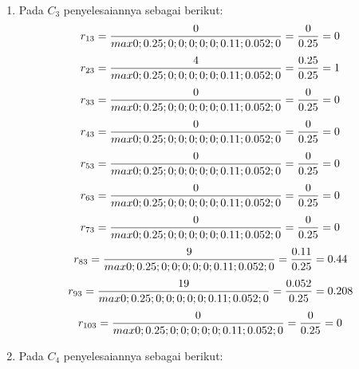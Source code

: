 \begin{enumerate}
\item Pada $C_{3}$ penyelesaiannya sebagai berikut:
\begin{displaymath}
r_{13} = \frac{0}{max {0;0.25;0;0;0;0;0;0.11;0.052;0}} = \frac{0}{0.25} = 0\\
\end {displaymath}
\begin{displaymath}
r_{23} = \frac{4}{max {0;0.25;0;0;0;0;0;0.11;0.052;0}} = \frac{0.25}{0.25} = 1\\
\end{displaymath}
\begin{displaymath}
r_{33} = \frac{0}{max {0;0.25;0;0;0;0;0;0.11;0.052;0}} = \frac{0}{0.25} = 0\\
\end {displaymath}
\begin{displaymath}
r_{43} = \frac{0}{max {0;0.25;0;0;0;0;0;0.11;0.052;0}} = \frac{0}{0.25} = 0\\
\end {displaymath}
\begin{displaymath}
r_{53} = \frac{0}{max {0;0.25;0;0;0;0;0;0.11;0.052;0}} = \frac{0}{0.25} = 0\\
\end {displaymath}
\begin{displaymath}
r_{63} = \frac{0}{max {0;0.25;0;0;0;0;0;0.11;0.052;0}} = \frac{0}{0.25} = 0\\
\end {displaymath}
\begin{displaymath}
r_{73} = \frac{0}{max {0;0.25;0;0;0;0;0;0.11;0.052;0}} = \frac{0}{0.25} = 0\\
\end {displaymath}
\begin{displaymath}
r_{83} = \frac{9}{max {0;0.25;0;0;0;0;0;0.11;0.052;0}} = \frac{0.11}{0.25} = 0.44\\
\end {displaymath}
\begin{displaymath}
r_{93} = \frac{19}{max {0;0.25;0;0;0;0;0;0.11;0.052;0}} = \frac{0.052}{0.25} = 0.208\\
\end {displaymath}
\begin{displaymath}
r_{103} = \frac{0}{max {0;0.25;0;0;0;0;0;0.11;0.052;0}} = \frac{0}{0.25} = 0\\
\end {displaymath}
\item Pada $C_{4}$ penyelesaiannya sebagai berikut:
\begin{displaymath}

\end{displaymath}
\end{enumerate}
